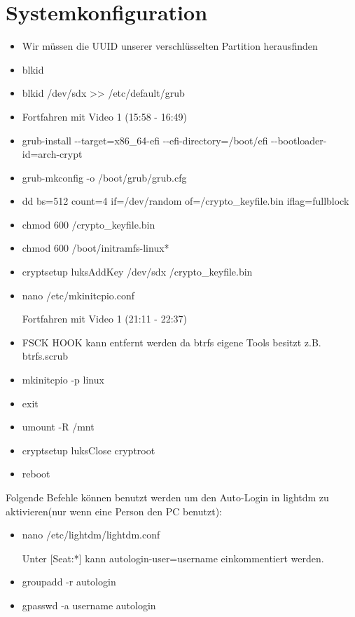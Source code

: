 \documentclass[11pt,a4paper]{article}
\begin{document}
\section{Systemkonfiguration }
\begin{itemize}
\item Wir müssen die UUID unserer verschlüsselten Partition herausfinden
\item blkid
\item blkid /dev/sdx >{}> /etc/default/grub
\item Fortfahren mit Video 1 (15:58 - 16:49)
\item grub-install -{}-target=x86\_64-efi -{}-efi-directory=/boot/efi -{}-bootloader-id=arch-crypt 
\item grub-mkconfig -o /boot/grub/grub.cfg
\item dd bs=512 count=4 if=/dev/random of=/crypto\_keyfile.bin iflag=fullblock
\item chmod 600 /crypto\_keyfile.bin
\item chmod 600 /boot/initramfs-linux*
\item cryptsetup luksAddKey /dev/sdx /crypto\_keyfile.bin
\item nano /etc/mkinitcpio.conf

Fortfahren mit Video 1 (21:11 - 22:37)
\item FSCK HOOK kann entfernt werden da btrfs eigene Tools besitzt z.B. btrfs.scrub
\item mkinitcpio -p linux
\item exit
\item umount -R /mnt
\item cryptsetup luksClose cryptroot
\item reboot
\end{itemize}
Folgende Befehle können benutzt werden um den Auto-Login in lightdm zu aktivieren(nur wenn eine Person den PC benutzt):
\begin{itemize}
\item nano /etc/lightdm/lightdm.conf

Unter [Seat:*] kann autologin-user=username einkommentiert werden.
\item groupadd -r autologin
\item gpasswd -a \glqq{}username\grqq{} autologin 
\end{itemize}
\end{document}

